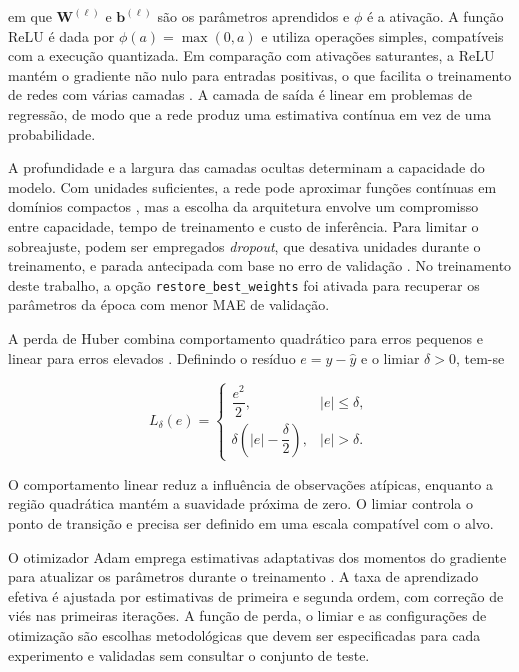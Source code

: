 \noindent em que $\mathbf{W}^{(\ell)}$ e $\mathbf{b}^{(\ell)}$ são os
parâmetros aprendidos e $\phi$ é a ativação. A função ReLU é dada por
$\phi(a)=\max(0,a)$ e utiliza operações simples, compatíveis com a
execução quantizada. Em comparação com ativações saturantes, a ReLU
mantém o gradiente não nulo para entradas positivas, o que facilita o
treinamento de redes com várias camadas \cite{glorot2011}. A camada de saída é linear em
problemas de regressão, de modo que a rede produz uma estimativa
contínua em vez de uma probabilidade.

A profundidade e a largura das camadas ocultas determinam a capacidade do
modelo. Com unidades suficientes, a rede pode aproximar funções contínuas em
domínios compactos \cite{hornik1989}, mas a escolha da arquitetura envolve
um compromisso entre capacidade, tempo de treinamento e custo de inferência.
Para limitar o sobreajuste, podem ser empregados \textit{dropout}, que
desativa unidades durante o treinamento, e parada antecipada com base no
erro de validação \cite{prechelt1998,srivastava2014}. No treinamento deste
trabalho, a opção \texttt{restore\_best\_weights} foi ativada para recuperar
os parâmetros da época com menor MAE de validação.

A perda de Huber combina comportamento quadrático para erros pequenos e
linear para erros elevados \cite{huber1964}. Definindo o resíduo
$e=y-\hat y$ e o limiar $\delta>0$, tem-se

\begin{equation}
\label{eq:ft-huber}
L_{\delta}(e)=
\begin{cases}
\dfrac{e^2}{2}, & |e|\leq\delta,\\[4pt]
\delta\left(|e|-\dfrac{\delta}{2}\right), & |e|>\delta.
\end{cases}
\end{equation}

O comportamento linear reduz a influência de observações atípicas,
enquanto a região quadrática mantém a suavidade próxima de zero. O
limiar controla o ponto de transição e precisa ser definido em uma
escala compatível com o alvo.

O otimizador Adam emprega estimativas adaptativas dos momentos do
gradiente para atualizar os parâmetros durante o treinamento
\cite{kingma2015}. A taxa de aprendizado efetiva é ajustada por
estimativas de primeira e segunda ordem, com correção de viés nas
primeiras iterações. A função de perda, o limiar e as configurações de
otimização são escolhas metodológicas que devem ser especificadas para
cada experimento e validadas sem consultar o conjunto de teste.


